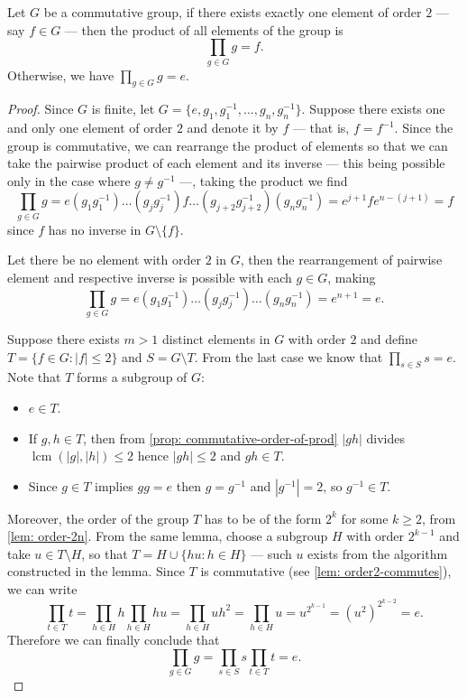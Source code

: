\begin{proposition}
  Let \(G\) be a commutative group, if there exists exactly one element of order
  \(2\) --- say \(f \in G\) --- then the product of all elements of the group is
  \[
    \prod_{g \in G} g = f.
  \]
  Otherwise, we have \(\prod_{g \in G} g = e\).
\end{proposition}

\begin{proof}
  Since \(G\) is finite, let \(G = \{e, g_1, g_1^{-1}, \dots, g_n, g_n^{-1}\}\).
  Suppose there exists one and only one element of order \(2\) and denote it by
  \(f\) --- that is, \(f = f^{-1}\). Since the group is commutative, we can
  rearrange the product of elements so that we can take the pairwise product of
  each element and its inverse --- this being possible only in the case where
  \(g \neq g^{-1}\) ---, taking the product we find
  \[
    \prod_{g \in G} g = e (g_1 g_1^{-1}) \dots (g_j g_j^{-1}) f \dots (g_{j + 2}
    g_{j + 2}^{-1}) (g_n g_n^{-1}) = e^{j + 1} f e^{n - (j + 1)} = f
  \]
  since \(f\) has no inverse in \(G \setminus \{f\}\).

  Let there be no element with order \(2\) in \(G\), then the rearrangement of
  pairwise element and respective inverse is possible with each \(g \in G\),
  making
  \[
    \prod_{g \in G} g = e (g_1 g_1^{-1}) \dots (g_j g_j^{-1}) \dots (g_n
    g_n^{-1}) = e^{n + 1} = e.
  \]

  Suppose there exists \(m > 1\) distinct elements in \(G\) with order \(2\) and
  define \(T = \{f \in G: |f| \leq 2\}\) and \(S = G \setminus T\). From the
  last case we know that \(\prod_{s \in S} s = e\). Note that \(T\) forms a
  subgroup of \(G\):
  \begin{itemize}
    \item \(e \in T\).
    \item If \(g, h \in T\), then from \cref{prop: commutative-order-of-prod}
      \(|gh|\) divides \(\operatorname{lcm}(|g|, |h|) \leq 2\) hence \(|gh| \leq
      2\) and \(gh \in T\).
    \item Since \(g \in T\) implies \(g g = e\) then \(g = g^{-1}\) and
      \(|g^{-1}| = 2\), so \(g^{-1} \in T\).
  \end{itemize}
  Moreover, the order of the group \(T\) has to be of the form \(2^k\) for some
  \(k \geq 2\), from \cref{lem: order-2n}. From the same lemma, choose a
  subgroup \(H\) with order \(2^{k-1}\) and take \(u \in T \setminus H\), so
  that \(T = H \cup \{hu: h \in H\}\) --- such \(u\) exists from the algorithm
  constructed in the lemma. Since \(T\) is commutative (see \cref{lem:
  order2-commutes}), we can write
  \[
    \prod_{t \in T} t = \prod_{h \in H} h \prod_{h \in H} hu = \prod_{h \in H} u
    h^2 = \prod_{h \in H} u = u^{2^{k-1}} = (u^2)^{2^{k-2}} = e.
  \]
  Therefore we can finally conclude that
  \[
    \prod_{g \in G} g = \prod_{s \in S} s \prod_{t \in T} t = e.
  \]
\end{proof}

